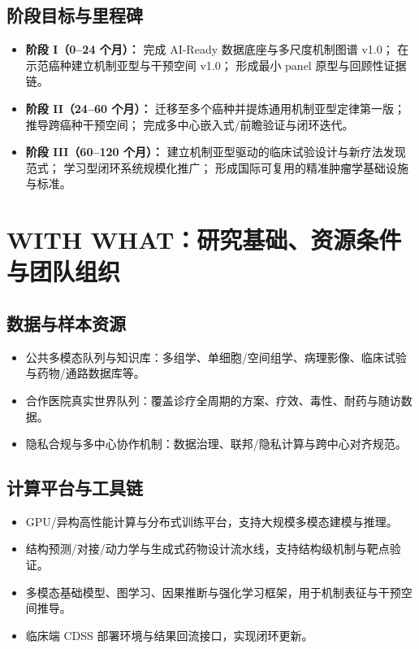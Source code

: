 \documentclass[12pt,a4paper,fontset=mac]{ctexart}
\begin{document}
\subsection{阶段目标与里程碑}
\begin{itemize}[leftmargin=2em]
  \item \textbf{阶段 I（0--24 个月）：}
        完成 AI-Ready 数据底座与多尺度机制图谱 v1.0；
        在示范癌种建立机制亚型与干预空间 v1.0；
        形成最小 panel 原型与回顾性证据链。
  \item \textbf{阶段 II（24--60 个月）：}
        迁移至多个癌种并提炼通用机制亚型定律第一版；
        推导跨癌种干预空间；
        完成多中心嵌入式/前瞻验证与闭环迭代。
  \item \textbf{阶段 III（60--120 个月）：}
        建立机制亚型驱动的临床试验设计与新疗法发现范式；
        学习型闭环系统规模化推广；
        形成国际可复用的精准肿瘤学基础设施与标准。
\end{itemize}

\section{WITH WHAT：研究基础、资源条件与团队组织}

\subsection{数据与样本资源}
\begin{itemize}[leftmargin=2em]
  \item 公共多模态队列与知识库：多组学、单细胞/空间组学、病理影像、临床试验与药物/通路数据库等。
  \item 合作医院真实世界队列：覆盖诊疗全周期的方案、疗效、毒性、耐药与随访数据。
  \item 隐私合规与多中心协作机制：数据治理、联邦/隐私计算与跨中心对齐规范。
\end{itemize}

\subsection{计算平台与工具链}
\begin{itemize}[leftmargin=2em]
  \item GPU/异构高性能计算与分布式训练平台，支持大规模多模态建模与推理。
  \item 结构预测/对接/动力学与生成式药物设计流水线，支持结构级机制与靶点验证。
  \item 多模态基础模型、图学习、因果推断与强化学习框架，用于机制表征与干预空间推导。
  \item 临床端 CDSS 部署环境与结果回流接口，实现闭环更新。
\end{itemize}
\end{document}
